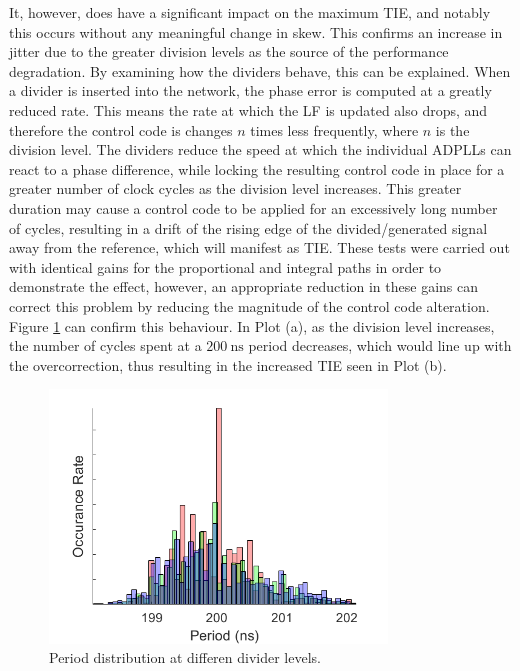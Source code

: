 It, however, does have a significant impact on the maximum \ac{TIE}, and notably this occurs without any meaningful change in skew. This confirms an increase in jitter due to the greater division levels as the source of the performance degradation. By examining how the dividers behave, this can be explained. When a divider is inserted into the network, the phase error is computed at a greatly reduced rate. This means the rate at which the \ac{LF} is updated also drops, and therefore the control code is changes $n$ times less frequently, where $n$ is the division level. The dividers reduce the speed at which the individual \acp{ADPLL} can react to a phase difference, while locking the resulting control code in place for a greater number of clock cycles as the division level increases. This greater duration may cause a control code to be applied for an excessively long number of cycles, resulting in a drift of the rising edge of the divided/generated signal away from the reference, which will manifest as \ac{TIE}. These tests were carried out with identical gains for the proportional and integral paths in order to demonstrate the effect, however, an appropriate reduction in these gains can correct this problem by reducing the magnitude of the control code alteration.
Figure \ref{fig:todo_div} can confirm this behaviour. In Plot (a), as the division level increases, the number of cycles spent at a $200~\si{\nano\second}$ period decreases, which would line up with the overcorrection, thus resulting in the increased \ac{TIE} seen in Plot (b).
\begin{figure}[h]%
    \centering
    \includegraphics[width=0.8\textwidth]{../dist2}
    \caption[Period distribution at differen divider levels]{Period distribution at differen divider levels.}    
    \label{fig:todo_div}
\end{figure}

